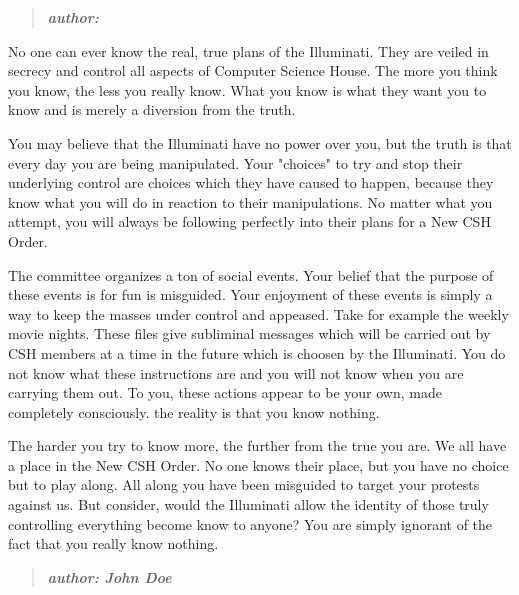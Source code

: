 \documentclass[9pt]{extarticle}
\begin{document}
\begin{minipage}[t]{.61\linewidth} %
\vspace{-0.4cm}
\hypertarget{firstnews}{}
\begin{quote}
\centering
\textbf{\textit{author: }}
\end{quote}

No one can ever know the real, true plans of the Illuminati. They are veiled 
in secrecy and control all aspects of Computer Science House. The more you 
think you know, the less you really know. What you know is what they want 
you to know and is merely a diversion from the truth. 

You may believe that the Illuminati have no power over you, but the truth is 
that every day you are being manipulated. Your "choices" to try and stop 
their underlying control are choices which they have caused to happen, because
they know what you will do in reaction to their manipulations. No matter what
you attempt, you will always be following perfectly into their plans for a 
New CSH Order. 

The committee organizes a ton of social events. Your belief that the purpose of
these events is for fun is misguided. Your enjoyment of these events is simply
a way to keep the masses under control and appeased. Take for example the weekly
movie nights. These files give subliminal messages which will be carried out by
CSH members at a time in the future which is choosen by the Illuminati. You
do not know what these instructions are and you will not know when you are
carrying them out. To you, these actions appear to be your own, made completely
consciously. the reality is that you know nothing. 

The harder you try to know more, the further from the true you are. We all have a 
place in the New CSH Order. No one knows their place, but you have no choice 
but to play along. All along you have been misguided to target your protests 
against us. But consider, would the Illuminati allow the identity of those 
truly controlling everything become know to anyone? You are simply ignorant of
the fact that you really know nothing.


\hypertarget{secondnews}{} 
\begin{quote}
\centering
\textbf{\textit{author: John Doe }}
\end{quote}


\end{minipage}
\end{document}

